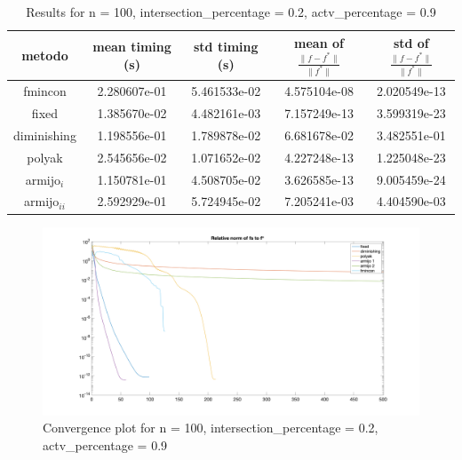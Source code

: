 
\begin{table}[H]
\setlength{\tabcolsep}{10pt} %
\renewcommand{\arraystretch}{1.2} %
\centering
\begin{tabular}{|ccccc|} 
\hline 
\multicolumn{1}{|c||}{metodo}   & \multicolumn{1}{c|}{mean timing (s)}    & \multicolumn{1}{c|}{std timing (s)} & \multicolumn{1}{c|}{mean of $\frac{\|f - f^*\|}{\|f^*\|}$}   & std of $\frac{\|f - f^*\|}{\|f^*\|}$ \\ \hline\hline 
\multicolumn{1}{|c||}{fmincon}       & \multicolumn{1}{c|}{2.280607e-01} & \multicolumn{1}{c|}{5.461533e-02}  & \multicolumn{1}{c|}{4.575104e-08} & 2.020549e-13  \\ \hline \hline
\multicolumn{1}{|c||}{fixed}       & \multicolumn{1}{c|}{1.385670e-02} & \multicolumn{1}{c|}{4.482161e-03}  & \multicolumn{1}{c|}{7.157249e-13} & 3.599319e-23  \\ \hline 
\multicolumn{1}{|c||}{diminishing}       & \multicolumn{1}{c|}{1.198556e-01} & \multicolumn{1}{c|}{1.789878e-02}  & \multicolumn{1}{c|}{6.681678e-02} & 3.482551e-01  \\ \hline 
\multicolumn{1}{|c||}{polyak}       & \multicolumn{1}{c|}{2.545656e-02} & \multicolumn{1}{c|}{1.071652e-02}  & \multicolumn{1}{c|}{4.227248e-13} & 1.225048e-23  \\ \hline 
\multicolumn{1}{|c||}{armijo$_{i}$}       & \multicolumn{1}{c|}{1.150781e-01} & \multicolumn{1}{c|}{4.508705e-02}  & \multicolumn{1}{c|}{3.626585e-13} & 9.005459e-24  \\ \hline 
\multicolumn{1}{|c||}{armijo$_{ii}$}       & \multicolumn{1}{c|}{2.592929e-01} & \multicolumn{1}{c|}{5.724945e-02}  & \multicolumn{1}{c|}{7.205241e-03} & 4.404590e-03  \\ \hline 
\end{tabular} 

\caption{Results for n = 100, intersection\_percentage = 0.2, actv\_percentage = 0.9}
\label{tab:100_zeronove_zerodue}
\end{table}


\begin{figure}[H]
\centering
    \includegraphics[width=20cm, center]{./plots/plot_100_zeronove_zerodue.png}
    \caption{Convergence plot for n = 100, intersection\_percentage = 0.2, actv\_percentage = 0.9}
    \label{fig:100_zeronove_zerodue}
\end{figure} 



